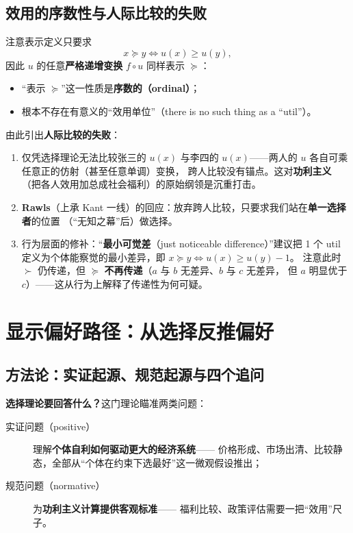 \subsection{效用的序数性与人际比较的失败}

注意表示定义只要求
\[
x\succeq y \iff u(x)\ge u(y),
\]
因此 $u$ 的任意\textbf{严格递增变换} $f\circ u$ 同样表示 $\succeq$：
\begin{itemize}
  \item “表示 $\succeq$”这一性质是\textbf{序数的（ordinal）}；
  \item 根本不存在有意义的“效用单位”（there is no such thing as a ``util''）。
\end{itemize}

由此引出\textbf{人际比较的失败}：
\begin{enumerate}
  \item 仅凭选择理论无法比较张三的 $u(x)$ 与李四的 $u(x)$——两人的 $u$ 各自可乘任意正的仿射（甚至任意单调）变换，
  跨人比较没有锚点。这对\textbf{功利主义}（把各人效用加总成社会福利）的原始纲领是沉重打击。
  \item \textbf{Rawls}（上承 Kant 一线）的回应：放弃跨人比较，只要求我们站在\textbf{单一选择者}的位置
  （“无知之幕”后）做选择。
  \item 行为层面的修补：“\textbf{最小可觉差}（just noticeable difference）”建议把 1 个 util
  定义为个体能察觉的最小差异，即 $x\succeq y \iff u(x)\ge u(y)-1$。
  注意此时 $\succ$ 仍传递，但 $\succeq$ \textbf{不再传递}（$a$ 与 $b$ 无差异、$b$ 与 $c$ 无差异，
  但 $a$ 明显优于 $c$）——这从行为上解释了传递性为何可疑。
\end{enumerate}

\section{显示偏好路径：从选择反推偏好}

\subsection{方法论：实证起源、规范起源与四个追问}

\textbf{选择理论要回答什么？}这门理论瞄准两类问题：
\begin{description}
  \item[实证问题（positive）] 理解\textbf{个体自利如何驱动更大的经济系统}——
  价格形成、市场出清、比较静态，全部从“个体在约束下选最好”这一微观假设推出；
  \item[规范问题（normative）] 为\textbf{功利主义计算提供客观标准}——
  福利比较、政策评估需要一把“效用”尺子。
\end{description}

